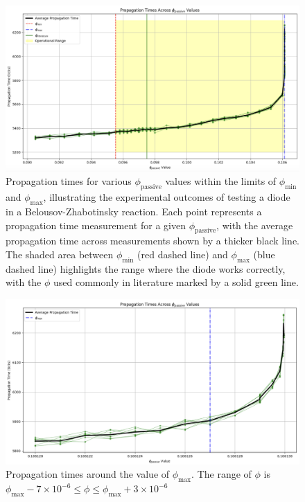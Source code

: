 \begin{figure}
    \centering
    \includegraphics[width=\linewidth]{Screenshot 2024-03-09 at 10.35.01.png}
    \caption{Propagation times for various $\phi_{\text{passive}}$ values within the limits of $\phi_{\text{min}}$ and $\phi_{\text{max}}$, 
    illustrating the experimental outcomes of testing a diode in a Belousov-Zhabotinsky reaction. 
    Each point represents a propagation time measurement for a given $\phi_{\text{passive}}$, 
    with the average propagation time across measurements shown by a thicker black line. 
    The shaded area between $\phi_{\text{min}}$ (red dashed line) and $\phi_{\text{max}}$ (blue dashed line) highlights the range 
    where the diode works correctly, with the $\phi$ used commonly in literature marked by a solid green line.}
    \label{fig:phi_passive_propagation_times}
    
\end{figure}

\begin{figure}
    \centering
    \includegraphics[width=1\linewidth]{Screenshot 2024-03-10 at 07.50.59.png}
    \caption{Propagation times around the value of $\phi_{\text{max}}$. The range of $\phi$ is $\phi_{\text{max}} - 7 \times 10^{-6} \leq \phi \leq \phi_{\text{max}} + 3 \times 10^{-6}$}
    \label{fig:phi_passive_propagation_times_detail_max}
\end{figure}



